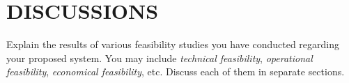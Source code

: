 \chapter{DISCUSSIONS}
\par Explain the results of various feasibility studies you have conducted 
regarding your proposed system. You may include \emph{technical feasibility}, 
\emph{operational feasibility}, \emph{economical feasibility}, etc. Discuss each 
of them in separate sections.

\newpage

